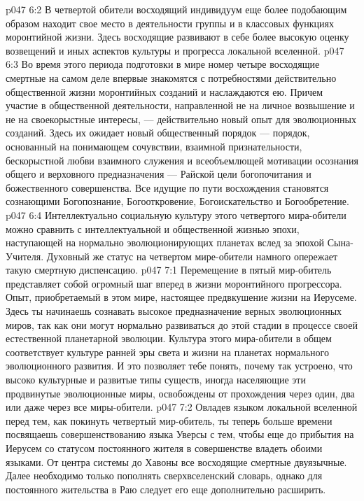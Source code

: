 \vs p047 6:2 В четвертой обители восходящий индивидуум еще более подобающим образом находит свое место в деятельности группы и в классовых функциях моронтийной жизни. Здесь восходящие развивают в себе более высокую оценку возвещений и иных аспектов культуры и прогресса локальной вселенной.
\vs p047 6:3 Во время этого периода подготовки в мире номер четыре восходящие смертные на самом деле впервые знакомятся с потребностями действительно общественной жизни моронтийных созданий и наслаждаются ею. Причем участие в общественной деятельности, направленной не на личное возвышение и не на своекорыстные интересы, --- действительно новый опыт для эволюционных созданий. Здесь их ожидает новый общественный порядок --- порядок, основанный на понимающем сочувствии, взаимной признательности, бескорыстной любви взаимного служения и всеобъемлющей мотивации осознания общего и верховного предназначения --- Райской цели богопочитания и божественного совершенства. Все идущие по пути восхождения становятся сознающими Богопознание, Богооткровение, Богоискательство и Богообретение.
\vs p047 6:4 Интеллектуально социальную культуру этого четвертого мира\hyp{}обители можно сравнить с интеллектуальной и общественной жизнью эпохи, наступающей на нормально эволюционирующих планетах вслед за эпохой Сына\hyp{}Учителя. Духовный же статус на четвертом мире\hyp{}обители намного опережает такую смертную диспенсацию.
\vs p047 7:1 Перемещение в пятый мир\hyp{}обитель представляет собой огромный шаг вперед в жизни моронтийного прогрессора. Опыт, приобретаемый в этом мире, настоящее предвкушение жизни на Иерусеме. Здесь ты начинаешь сознавать высокое предназначение верных эволюционных миров, так как они могут нормально развиваться до этой стадии в процессе своей естественной планетарной эволюции. Культура этого мира\hyp{}обители в общем соответствует культуре ранней эры света и жизни на планетах нормального эволюционного развития. И это позволяет тебе понять, почему так устроено, что высоко культурные и развитые типы существ, иногда населяющие эти продвинутые эволюционные миры, освобождены от прохождения через один, два или даже через все миры\hyp{}обители.
\vs p047 7:2 Овладев языком локальной вселенной перед тем, как покинуть четвертый мир\hyp{}обитель, ты теперь больше времени посвящаешь совершенствованию языка Уверсы с тем, чтобы еще до прибытия на Иерусем со статусом постоянного жителя в совершенстве владеть обоими языками. От центра системы до Хавоны все восходящие смертные двуязычные. Далее необходимо только пополнять сверхвселенский словарь, однако для постоянного жительства в Раю следует его еще дополнительно расширить.

